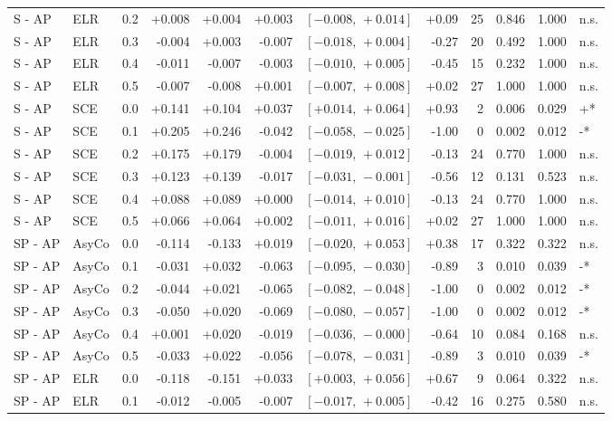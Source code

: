 \begin{landscape}
\begin{scriptsize}
\begin{longtable}{lllrrrrrrrrl}
S - AP & ELR & 0.2 & +0.008 & +0.004 & +0.003 & $[-0.008,\,+0.014]$ & +0.09 & 25 & 0.846 & 1.000 & n.s. \\
S - AP & ELR & 0.3 & -0.004 & +0.003 & -0.007 & $[-0.018,\,+0.004]$ & -0.27 & 20 & 0.492 & 1.000 & n.s. \\
S - AP & ELR & 0.4 & -0.011 & -0.007 & -0.003 & $[-0.010,\,+0.005]$ & -0.45 & 15 & 0.232 & 1.000 & n.s. \\
S - AP & ELR & 0.5 & -0.007 & -0.008 & +0.001 & $[-0.007,\,+0.008]$ & +0.02 & 27 & 1.000 & 1.000 & n.s. \\
S - AP & SCE & 0.0 & +0.141 & +0.104 & +0.037 & $[+0.014,\,+0.064]$ & +0.93 & 2 & 0.006 & 0.029 & +* \\
S - AP & SCE & 0.1 & +0.205 & +0.246 & -0.042 & $[-0.058,\,-0.025]$ & -1.00 & 0 & 0.002 & 0.012 & -* \\
S - AP & SCE & 0.2 & +0.175 & +0.179 & -0.004 & $[-0.019,\,+0.012]$ & -0.13 & 24 & 0.770 & 1.000 & n.s. \\
S - AP & SCE & 0.3 & +0.123 & +0.139 & -0.017 & $[-0.031,\,-0.001]$ & -0.56 & 12 & 0.131 & 0.523 & n.s. \\
S - AP & SCE & 0.4 & +0.088 & +0.089 & +0.000 & $[-0.014,\,+0.010]$ & -0.13 & 24 & 0.770 & 1.000 & n.s. \\
S - AP & SCE & 0.5 & +0.066 & +0.064 & +0.002 & $[-0.011,\,+0.016]$ & +0.02 & 27 & 1.000 & 1.000 & n.s. \\
SP - AP & AsyCo & 0.0 & -0.114 & -0.133 & +0.019 & $[-0.020,\,+0.053]$ & +0.38 & 17 & 0.322 & 0.322 & n.s. \\
SP - AP & AsyCo & 0.1 & -0.031 & +0.032 & -0.063 & $[-0.095,\,-0.030]$ & -0.89 & 3 & 0.010 & 0.039 & -* \\
SP - AP & AsyCo & 0.2 & -0.044 & +0.021 & -0.065 & $[-0.082,\,-0.048]$ & -1.00 & 0 & 0.002 & 0.012 & -* \\
SP - AP & AsyCo & 0.3 & -0.050 & +0.020 & -0.069 & $[-0.080,\,-0.057]$ & -1.00 & 0 & 0.002 & 0.012 & -* \\
SP - AP & AsyCo & 0.4 & +0.001 & +0.020 & -0.019 & $[-0.036,\,-0.000]$ & -0.64 & 10 & 0.084 & 0.168 & n.s. \\
SP - AP & AsyCo & 0.5 & -0.033 & +0.022 & -0.056 & $[-0.078,\,-0.031]$ & -0.89 & 3 & 0.010 & 0.039 & -* \\
SP - AP & ELR & 0.0 & -0.118 & -0.151 & +0.033 & $[+0.003,\,+0.056]$ & +0.67 & 9 & 0.064 & 0.322 & n.s. \\
SP - AP & ELR & 0.1 & -0.012 & -0.005 & -0.007 & $[-0.017,\,+0.005]$ & -0.42 & 16 & 0.275 & 0.580 & n.s. \\

\end{longtable}
\end{scriptsize}
\end{landscape}

